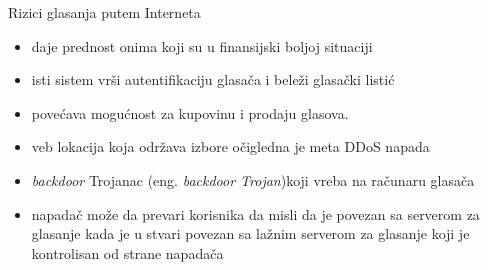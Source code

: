     
    \begin{frame}{Rizici glasanja putem Interneta}
    	\begin{itemize}
			\item daje prednost onima koji su u finansijski boljoj situaciji
			\item isti sistem vrši autentifikaciju glasača i beleži glasački listić
			\item povećava mogućnost za kupovinu i prodaju glasova.
			\item veb lokacija koja održava izbore očigledna je meta DDoS napada
			\item \textit{backdoor} Trojanac (eng. {\em backdoor Trojan})koji vreba na računaru glasača
			\item napadač može da prevari korisnika da misli da je povezan sa serverom za glasanje kada je u stvari povezan sa lažnim serverom za glasanje koji je kontrolisan od strane napadača	
		\end{itemize}
    \end{frame}